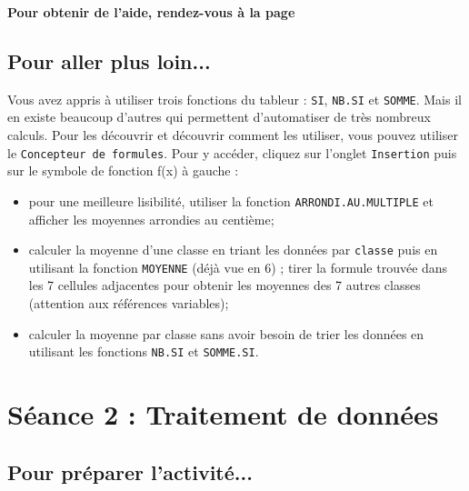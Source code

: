 \textbf{Pour obtenir de l'aide, rendez-vous à la page \pageref{AideTableur03}}

\subsection{Pour aller plus loin...}

Vous avez appris à utiliser trois fonctions du tableur : \texttt{SI}, \texttt{NB.SI} et \texttt{SOMME}. Mais il en existe beaucoup d'autres qui permettent d'automatiser de très nombreux calculs. Pour les découvrir et découvrir comment les utiliser, vous pouvez utiliser le \texttt{Concepteur de formules}. Pour y accéder, cliquez sur l'onglet \texttt{Insertion}  puis sur le symbole de fonction f(x) à gauche :

\begin{itemize}
\item pour une meilleure lisibilité, utiliser la fonction \texttt{ARRONDI.AU.MULTIPLE} et afficher les moyennes arrondies au centième;
\item calculer la moyenne d'une classe en triant les données par \texttt{classe} puis en utilisant la fonction \texttt{MOYENNE} (déjà vue en 6) ; tirer la formule trouvée dans les 7 cellules adjacentes pour obtenir les moyennes des 7 autres classes (attention aux références variables);
\item calculer la moyenne par classe sans avoir besoin de trier les données en utilisant les fonctions \texttt{NB.SI} et \texttt{SOMME.SI}.
\end{itemize}

\vfill








%
%
%
%


\pagebreak

\section{Séance 2 : Traitement de données}\label{ficheTableur4e2}

\subsection{Pour préparer l'activité...}

